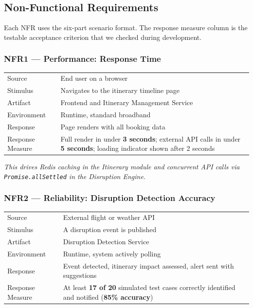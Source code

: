 \documentclass[12pt,a4paper]{article}
\begin{document}
\subsection{Non-Functional Requirements}

Each NFR uses the six-part scenario format. The response measure column is the testable
acceptance criterion that we checked during development.

\subsubsection{NFR1 --- Performance: Response Time}

\begin{tabularx}{\textwidth}{@{}L{3.5cm}X@{}}
\toprule
Source & End user on a browser \\
Stimulus & Navigates to the itinerary timeline page \\
Artifact & Frontend and Itinerary Management Service \\
Environment & Runtime, standard broadband \\
Response & Page renders with all booking data \\
Response Measure & Full render in under \textbf{3 seconds}; external API calls in under
  \textbf{5 seconds}; loading indicator shown after 2 seconds \\
\bottomrule
\end{tabularx}

\textit{This drives Redis caching in the Itinerary module and concurrent API calls via
\texttt{Promise.allSettled} in the Disruption Engine.}

\vspace{1em}
\subsubsection{NFR2 --- Reliability: Disruption Detection Accuracy}

\begin{tabularx}{\textwidth}{@{}L{3.5cm}X@{}}
\toprule
Source & External flight or weather API \\
Stimulus & A disruption event is published \\
Artifact & Disruption Detection Service \\
Environment & Runtime, system actively polling \\
Response & Event detected, itinerary impact assessed, alert sent with suggestions \\
Response Measure & At least \textbf{17 of 20} simulated test cases correctly identified and
  notified (\textbf{85\% accuracy}) \\
\bottomrule
\end{tabularx}
\end{document}
